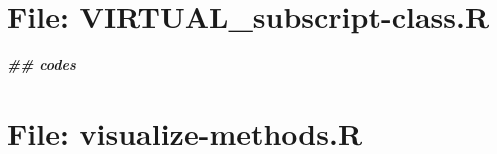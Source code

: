 \documentclass[
]{article}
\newenvironment{Shaded}{\begin{snugshade}}{\end{snugshade}}
\newcommand{\DocumentationTok}[1]{\textcolor[rgb]{0.56,0.35,0.01}{\textbf{\textit{#1}}}}
\begin{document}
\hypertarget{file-virtual_subscript-class.r}{%
\section{File: VIRTUAL\_subscript-class.R}\label{file-virtual_subscript-class.r}}

\begin{Shaded}
\begin{Highlighting}[]
\DocumentationTok{\#\# codes}
\end{Highlighting}
\end{Shaded}

\hypertarget{file-visualize-methods.r}{%
\section{File: visualize-methods.R}\label{file-visualize-methods.r}}
\end{document}
